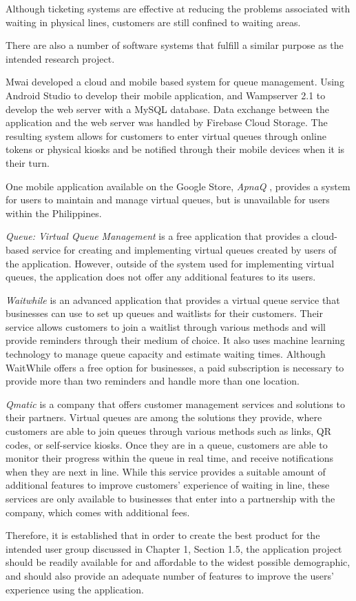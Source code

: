 Although ticketing systems are effective at reducing the problems associated with waiting in physical lines, customers are still confined to waiting areas.

There are also a number of software systems that fulfill a similar purpose as the intended research project.

	Mwai \citeyear{mwaivirtual} developed a cloud and mobile based system for queue management. Using Android Studio to develop their mobile application, and Wampserver 2.1 to develop the web server with a MySQL database. Data exchange between the application and the web server was handled by Firebase Cloud Storage. The resulting system allows for customers to enter virtual queues through online tokens or physical kiosks and be notified through their mobile devices when it is their turn.

One mobile application available on the Google Store, \textit{ApnaQ} \citeyear{appnaq}, provides a system for users to maintain and manage virtual queues, but is unavailable for users within the Philippines.

\textit{Queue: Virtual Queue Management} \citeyear{virtualqueueapp} is a free application that provides a cloud-based service for creating and implementing virtual queues created by users of the application. However, outside of the system used for implementing virtual queues, the application does not offer any additional features to its users.

\textit{Waitwhile} \citeyear{waitwhile} is an advanced application that provides a virtual queue service that businesses can use to set up queues and waitlists for their customers. Their service allows customers to join a waitlist through various methods and will provide reminders through their medium of choice. It also uses machine learning technology to manage queue capacity and estimate waiting times. Although WaitWhile offers a free option for businesses, a paid subscription is necessary to provide more than two reminders and handle more than one location.

\textit{Qmatic} \citeyear{qmatic} is a company that offers customer management services and solutions to their partners. Virtual queues are among the solutions they provide, where customers are able to join queues through various methods such as links, QR codes, or self-service kiosks. Once they are in a queue, customers are able to monitor their progress within the queue in real time, and receive notifications when they are next in line. While this service provides a suitable amount of additional features to improve customers’ experience of waiting in line, these services are only available to businesses that enter into a partnership with the company, which comes with additional fees.

Therefore, it is established that in order to create the best product for the intended user group discussed in Chapter 1, Section 1.5, the application project should be readily available for and affordable to the widest possible demographic, and should also provide an adequate number of features to improve the users’ experience using the application.
